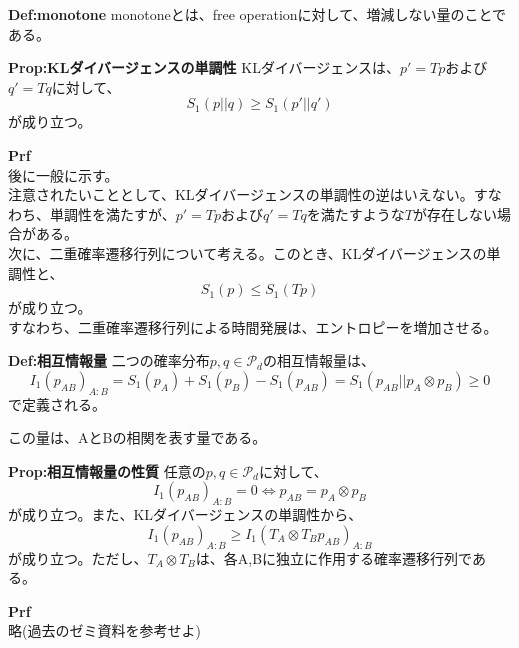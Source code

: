 \documentclass[a4paper,11pt]{jsarticle}
\numberwithin{equation}{section}
\begin{document}
\begin{itembox}[l]{\textbf{Def:monotone}}
    monotoneとは、free operationに対して、増減しない量のことである。

\end{itembox}
\begin{itembox}[l]{\textbf{Prop:KLダイバージェンスの単調性}}
    KLダイバージェンスは、$p' = Tp$および$q' = Tq$に対して、
    \begin{equation}
        S_1(p||q) \geq S_1(p'||q')
    \end{equation}
    が成り立つ。
\end{itembox}
\textbf{Prf}\\
後に一般に示す。\\

注意されたいこととして、KLダイバージェンスの単調性の逆はいえない。すなわち、単調性を満たすが、$p' = Tp$および$q' = Tq$を満たすような$T$が存在しない場合がある。\\

次に、二重確率遷移行列について考える。このとき、KLダイバージェンスの単調性と、
\begin{equation}
    S_1(p) \leq S_1(Tp)
\end{equation}
が成り立つ。\\
すなわち、二重確率遷移行列による時間発展は、エントロピーを増加させる。\\

\begin{itembox}[l]{\textbf{Def:相互情報量}}
    二つの確率分布$p, q \in \mathcal{P}_d$の相互情報量は、
    \begin{equation}
        I_1 (p_{AB})_{A:B} = S_1 (p_A) + S_1 (p_B) - S_1 (p_{AB}) = S_1(p_{AB}||p_A \otimes p_B) \geq 0
    \end{equation}
    で定義される。
\end{itembox}
この量は、AとBの相関を表す量である。\\
\begin{itembox}[l]{\textbf{Prop:相互情報量の性質}}
    任意の$p, q \in \mathcal{P}_d$に対して、
    \begin{equation}
        I_1(p_{AB})_{A:B} =0 \Leftrightarrow p_{AB} = p_A \otimes p_B
    \end{equation}
    が成り立つ。また、KLダイバージェンスの単調性から、
    \begin{equation}
        I_1(p_{AB})_{A:B} \geq I_1(T_A \otimes T_B p_{AB})_{A:B}
    \end{equation}
    が成り立つ。ただし、$T_A \otimes T_B$は、各A,Bに独立に作用する確率遷移行列である。\\
    
\end{itembox}
\textbf{Prf}\\
略(過去のゼミ資料を参考せよ)\hfill \qedsymbol\\
\end{document}
